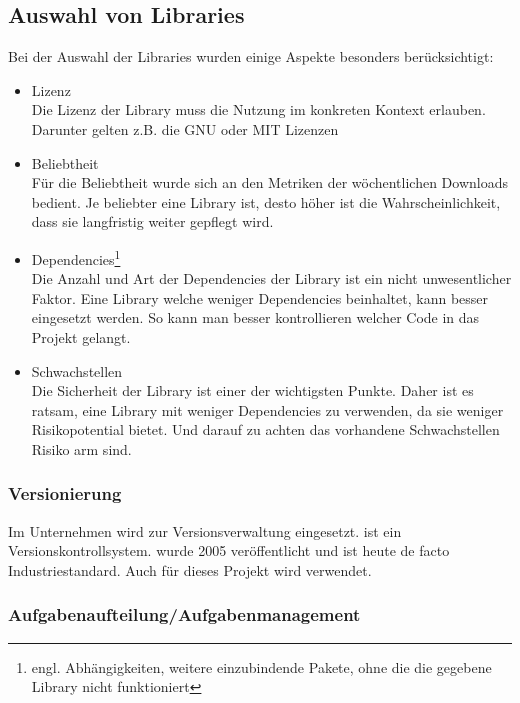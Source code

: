 \subsection{Auswahl von Libraries}
\label{sec:Durchführungsphase:AuswahlVonLibraries}

Bei der Auswahl der Libraries wurden einige Aspekte besonders berücksichtigt:

\begin{itemize}
    \item Lizenz\\
    Die Lizenz der Library muss die Nutzung im konkreten Kontext erlauben. Darunter gelten z.B. die GNU oder MIT Lizenzen
    \item Beliebtheit\\
    Für die Beliebtheit wurde sich an den Metriken der wöchentlichen Downloads bedient. Je beliebter eine Library ist, desto höher ist die Wahrscheinlichkeit, dass sie langfristig weiter gepflegt wird.
    \item Dependencies\footnote{engl. Abhängigkeiten, weitere einzubindende Pakete, ohne die die gegebene Library nicht funktioniert}\\
	Die Anzahl und Art der Dependencies der Library ist ein nicht unwesentlicher Faktor. Eine Library welche weniger Dependencies beinhaltet, kann besser eingesetzt werden. So kann man besser kontrollieren welcher Code in das Projekt gelangt.
	\item Schwachstellen\\
	Die Sicherheit der Library ist einer der wichtigsten Punkte. Daher ist es ratsam, eine Library mit weniger Dependencies zu verwenden, da sie weniger Risikopotential bietet. Und darauf zu achten das vorhandene Schwachstellen Risiko arm sind.
\end{itemize}

\subsubsection{Versionierung}

Im Unternehmen wird  zur Versionsverwaltung eingesetzt.  ist ein Versionskontrollsystem.  wurde 2005 veröffentlicht und ist heute de facto Industriestandard. Auch für dieses Projekt wird  verwendet.

\subsubsection{Aufgabenaufteilung/Aufgabenmanagement}

